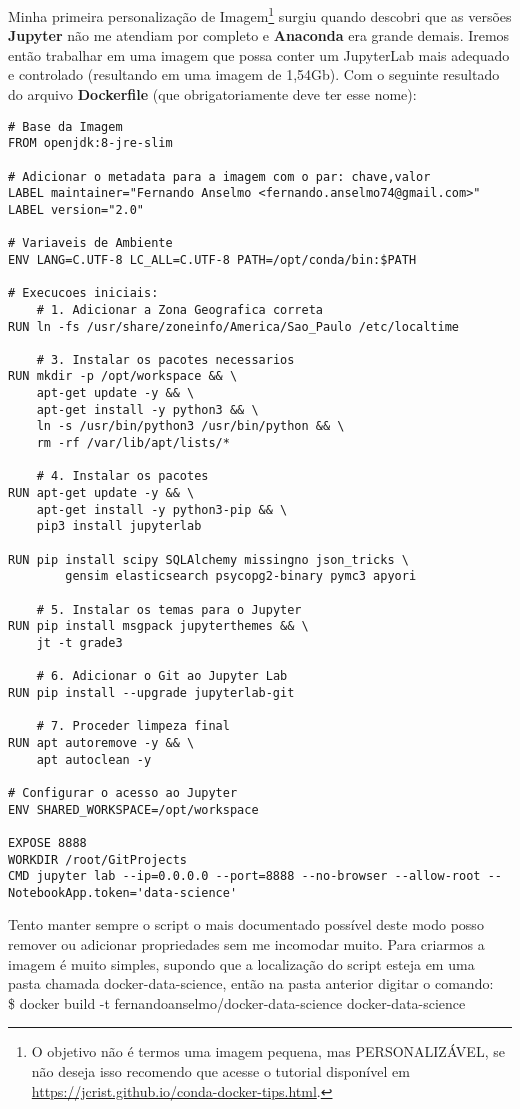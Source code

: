 Minha primeira personalização de Imagem\footnote{O objetivo não é termos uma imagem pequena, mas PERSONALIZÁVEL, se não deseja isso recomendo que acesse o tutorial disponível em \url{https://jcrist.github.io/conda-docker-tips.html}.} surgiu quando descobri que as versões \textbf{Jupyter} não me atendiam por completo e \textbf{Anaconda} era grande demais. Iremos então trabalhar em uma imagem que possa conter um JupyterLab mais adequado e controlado (resultando em uma imagem de 1,54Gb). Com o seguinte resultado do arquivo \textbf{Dockerfile} (que obrigatoriamente deve ter esse nome):
\begin{lstlisting}[]
# Base da Imagem
FROM openjdk:8-jre-slim

# Adicionar o metadata para a imagem com o par: chave,valor
LABEL maintainer="Fernando Anselmo <fernando.anselmo74@gmail.com>"
LABEL version="2.0"

# Variaveis de Ambiente
ENV LANG=C.UTF-8 LC_ALL=C.UTF-8 PATH=/opt/conda/bin:$PATH

# Execucoes iniciais:
    # 1. Adicionar a Zona Geografica correta
RUN ln -fs /usr/share/zoneinfo/America/Sao_Paulo /etc/localtime

    # 3. Instalar os pacotes necessarios
RUN mkdir -p /opt/workspace && \
    apt-get update -y && \
    apt-get install -y python3 && \
    ln -s /usr/bin/python3 /usr/bin/python && \
    rm -rf /var/lib/apt/lists/*

    # 4. Instalar os pacotes
RUN apt-get update -y && \
    apt-get install -y python3-pip && \
    pip3 install jupyterlab

RUN pip install scipy SQLAlchemy missingno json_tricks \
        gensim elasticsearch psycopg2-binary pymc3 apyori

    # 5. Instalar os temas para o Jupyter
RUN pip install msgpack jupyterthemes && \
    jt -t grade3

    # 6. Adicionar o Git ao Jupyter Lab
RUN pip install --upgrade jupyterlab-git

    # 7. Proceder limpeza final
RUN apt autoremove -y && \
    apt autoclean -y

# Configurar o acesso ao Jupyter
ENV SHARED_WORKSPACE=/opt/workspace

EXPOSE 8888
WORKDIR /root/GitProjects
CMD jupyter lab --ip=0.0.0.0 --port=8888 --no-browser --allow-root --NotebookApp.token='data-science'
\end{lstlisting}

Tento manter sempre o script o mais documentado possível deste modo posso remover ou adicionar propriedades sem me incomodar muito. Para criarmos a imagem é muito simples, supondo que a localização do script esteja em uma pasta chamada docker-data-science, então na pasta anterior digitar o comando: \\
{\ttfamily\$ docker build -t fernandoanselmo/docker-data-science docker-data-science}

